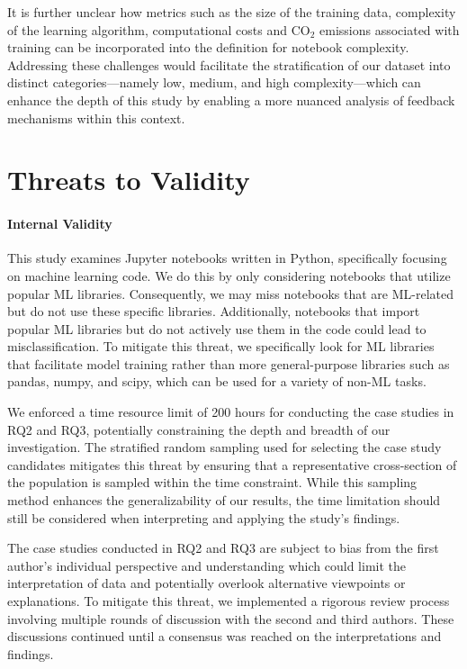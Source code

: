 \documentclass[smallextended]{svjour3}       %
\begin{document}
It is further unclear how metrics such as the size of the training data, complexity of the learning algorithm, computational costs and CO\(_2\) emissions associated with training can be incorporated into the definition for notebook complexity. Addressing these challenges would facilitate the stratification of our dataset into distinct categories---namely low, medium, and high complexity---which can enhance the depth of this study by enabling a more nuanced analysis of feedback mechanisms within this context.

\section{Threats to Validity}\label{sec:threats}

\paragraph{\textbf{Internal Validity}} This study examines Jupyter notebooks written in Python, specifically focusing on machine learning code. We do this by only considering notebooks that utilize popular ML libraries. Consequently, we may miss notebooks that are ML-related but do not use these specific libraries. Additionally, notebooks that import popular ML libraries but do not actively use them in the code could lead to misclassification. To mitigate this threat, we specifically look for ML libraries that facilitate model training rather than more general-purpose libraries such as pandas, numpy, and scipy, which can be used for a variety of non-ML tasks.

We enforced a time resource limit of 200 hours for conducting the case studies in RQ2 and RQ3, potentially constraining the depth and breadth of our investigation. The stratified random sampling used for selecting the case study candidates mitigates this threat by ensuring that a representative cross-section of the population is sampled within the time constraint. While this sampling method enhances the generalizability of our results, the time limitation should still be considered when interpreting and applying the study's findings.

The case studies conducted in RQ2 and RQ3 are subject to bias from the first author's individual perspective and understanding which could limit the interpretation of data and potentially overlook alternative viewpoints or explanations. To mitigate this threat, we implemented a rigorous review process involving multiple rounds of discussion with the second and third authors. These discussions continued until a consensus was reached on the interpretations and findings.
\end{document}
